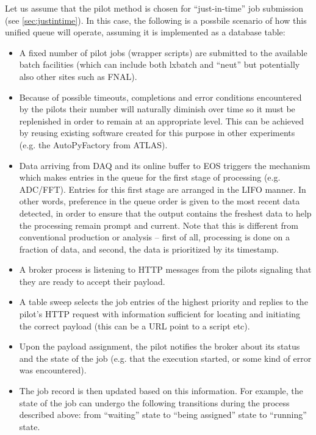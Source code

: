 \documentclass[pdftex,12pt,letter]{article}
\begin{document}
Let us assume that the pilot method is chosen for ``just-in-time'' job submission (see \ref{sec:justintime}). In this
case, the following is a possbile scenario of how this unified queue will operate, assuming it is implemented
as a database table:
\begin{itemize}

\item A fixed number of pilot jobs (wrapper scripts) are submitted to the available batch facilities (which can include both
lxbatch and ``neut'' but potentially also other sites such as FNAL).

\item Because of possible timeouts, completions and error conditions encountered by the pilots their number will naturally
diminish over time so it must be replenished in order to remain at an appropriate level. This can be achieved by reusing
existing software created for this purpose in other experiments (e.g. the AutoPyFactory from ATLAS).

\item Data arriving from DAQ and its online buffer to EOS triggers the mechanism which makes entries in the queue for the
first stage of processing (e.g. ADC/FFT). Entries for this first stage are arranged in the LIFO manner. In other words, preference
in the queue order is given to the most recent data detected, in order to ensure that the output contains the freshest
data to help the processing remain prompt and current. Note that this is different from conventional production or analysis --
first of all, processing is done on a fraction of data, and second, the data is prioritized by its timestamp.

\item A broker process is listening to HTTP messages from the pilots signaling that they are ready to accept their payload.

\item A table sweep selects the job entries of the highest priority and replies to the pilot's HTTP request with information
sufficient for locating and initiating the correct payload (this can be a URL point to a script etc).

\item Upon the payload assignment, the pilot notifies the broker about its status and the state of the job (e.g.
that the execution started, or some kind of error was encountered).

\item The job record is then updated based on this information. For example, the state of the job can undergo the following
transitions  during the process described above: from ``waiting'' state to ``being assigned'' state to ``running'' state.


\end{itemize}
\end{document}
